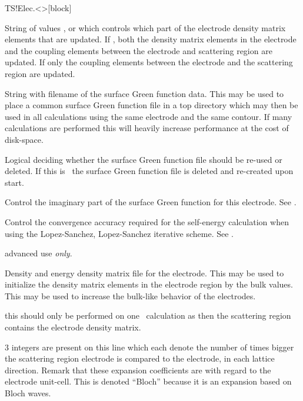 \begin{fdfentry}{TS!Elec.<>}[block]
\begin{fdfoptions}
    \option[DM-update]%
    String of values ,  or 
    which controls which part of the electrode density matrix elements
    that are updated. If , both the density matrix elements
    in the electrode and the coupling elements between the 
    electrode and scattering region are updated. If 
    only the coupling elements between the electrode and the
    scattering region are updated.

    \option[Gf]%
    String with filename of the surface Green function data. This may
    be used to place a common surface Green function file in a top
    directory which may then be used in all calculations using the
    same electrode and the same contour. 
    If many calculations are performed this will heavily increase
    performance at the cost of disk-space.

    \option[Gf-reuse]%
    Logical deciding whether the surface Green function file should be
    re-used or deleted.
    If this is \fdffalse\ the surface Green function file is deleted
    and re-created upon start.
    
    \option[Eta]%
    Control the imaginary part of the surface Green function for this
    electrode. See .

    \option[Accuracy]%
    Control the convergence accuracy required for the self-energy
    calculation when using the Lopez-Sanchez, Lopez-Sanchez iterative
    scheme. 
    See .

    \note advanced use \emph{only}.
    
    \option[DE]%
    Density and energy density matrix file for the electrode. This may
    be used to initialize the density matrix elements in the electrode
    region by the bulk values. This may be used to increase the
    bulk-like behavior of the electrodes. 

    \note this should only be performed on one \tsiesta\ calculation
    as then the scattering region  contains the
    electrode density matrix.

    \option[Bloch]%
    $3$ integers are present on this line which each denote the number
    of times bigger the scattering region electrode is compared to the
    electrode, in each lattice direction. Remark that these expansion
    coefficients are with regard to the electrode unit-cell.
    This is denoted ``Bloch'' because it is an expansion based on
    Bloch waves.


\end{fdfoptions}
\end{fdfentry}
